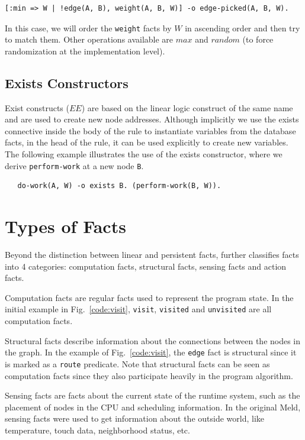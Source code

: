 \begin{Verbatim}
[:min => W | !edge(A, B), weight(A, B, W)] -o edge-picked(A, B, W).
\end{Verbatim}

In this case, we will order the \texttt{weight} facts by $W$ in ascending order and then try
to match them. Other operations available are $max$ and $random$ (to force randomization at the
implementation level).

\subsection{Exists Constructors}

Exist constructs ($EE$) are based on the linear logic construct of the same name and are used to create new node addresses. Although implicitly we use the exists connective inside the body
of the rule to instantiate variables from the database facts, in the head of the rule,
it can be used explicitly to create new variables.   
The following example illustrates the use of the exists constructor, where we derive
\texttt{perform-work} at a new node \texttt{B}.

\begin{Verbatim}
   do-work(A, W) -o exists B. (perform-work(B, W)).
\end{Verbatim}

\section{Types of Facts}

Beyond the distinction between linear and persistent facts, \lang further classifies facts
into 4 categories: computation facts, structural facts, sensing facts and action facts.

Computation facts are regular facts used to represent the program state. In the initial
example in Fig.~\ref{code:visit}, \texttt{visit}, \texttt{visited} and \texttt{unvisited}
are all computation facts.

Structural facts describe information about the connections between the nodes in the graph.
In the example of Fig.~\ref{code:visit}, the \texttt{edge} fact is structural since it
is marked as a \texttt{route} predicate. Note that structural facts can be seen as
computation facts since they also participate heavily in the program algorithm.

Sensing facts are facts about the current state of the runtime system, such as the placement
of nodes in the CPU and scheduling information. In the original Meld, sensing facts
were used to get information about the outside world, like temperature, touch data,
neighborhood status, etc.

